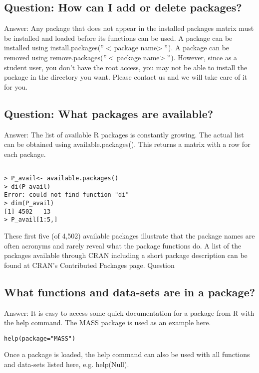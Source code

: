 \documentclass[12pt]{article}
\begin{document}
\subsection{Question: How can I add or delete packages?}
Answer: 
Any package that does not appear in the installed packages matrix must be installed and loaded before its functions can be used. A package can be installed using install.packages($"<$ package name$>"$). A package can be removed using remove.packages($"<$ package name$>"$). However, since as a student user, you don't have the root access, you may not be able to install the package in the directory you want. Please contact us and we will take care of it for you.\\

\subsection{Question: What packages are available?}
Answer:
The list of available R packages is constantly growing. The actual list can be obtained using available.packages(). This returns a matrix with a row for each package.

\begin{verbatim}

> P_avail<- available.packages()
> di(P_avail)
Error: could not find function "di"
> dim(P_avail)
[1] 4502   13
> P_avail[1:5,]

\end{verbatim}

These first five (of 4,502) available packages illustrate that the package names are often acronyms and rarely reveal what the package functions do. A list of the packages available through CRAN including a short package description can be found at CRAN's Contributed Packages page.
Question
\subsection{What functions and data-sets are in a package?}
Answer: 
It is easy to access some quick documentation for a package from R with the help command. The MASS package is used as an example here. \\

\begin{lstlisting}[label= Help ,caption= getting information on packages]
help(package="MASS")                    
\end{lstlisting}
Once a package is loaded, the help command can also be used with all functions and data-sets listed here, e.g. help(Null).
\end{document}
